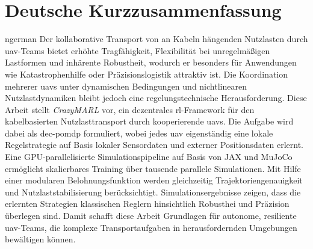 \chapter*{Deutsche Kurzzusammenfassung}
\begin{hyphenrules}{ngerman}
Der kollaborative Transport von an Kabeln hängenden Nutzlasten durch \gls{uav}-Teams bietet erhöhte Tragfähigkeit, Flexibilität bei unregelmäßigen Lastformen und inhärente Robustheit, wodurch er besonders für Anwendungen wie Katastrophenhilfe oder Präzisionslogistik attraktiv ist. Die Koordination mehrerer \glspl{uav} unter dynamischen Bedingungen und nichtlinearen Nutzlastdynamiken bleibt jedoch eine regelungstechnische Herausforderung. Diese Arbeit stellt \textit{CrazyMARL} vor, ein dezentrales \gls{rl}-Framework für den kabelbasierten Nutzlasttransport durch kooperierende \glspl{uav}. Die Aufgabe wird dabei als \gls{dec-pomdp} formuliert, wobei jedes \gls{uav} eigenständig eine lokale Regelstrategie auf Basis lokaler Sensordaten und externer Positionsdaten erlernt. Eine GPU-parallelisierte Simulationspipeline auf Basis von JAX und MuJoCo ermöglicht skalierbares Training über tausende parallele Simulationen. Mit Hilfe einer modularen Belohnungsfunktion werden gleichzeitig Trajektoriengenauigkeit und Nutzlaststabilisierung berücksichtigt. Simulationsergebnisse zeigen, dass die erlernten Strategien klassischen Reglern hinsichtlich Robusthei und Präzision überlegen sind. Damit schafft diese Arbeit Grundlagen für autonome, resiliente \gls{uav}-Teams, die komplexe Transportaufgaben in herausfordernden Umgebungen bewältigen können.
\end{hyphenrules}

\pagebreak